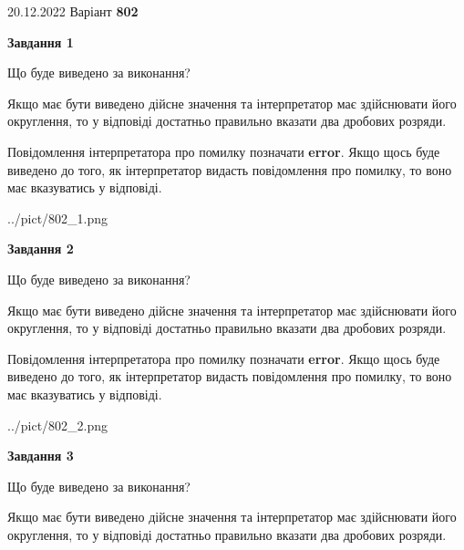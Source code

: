 \documentclass[12pt, ukrainian]{article}
\begin{document}
{20.12.2022 Варіант \No \textbf { 802 }\par}
{
\begin {Large}

{\begin {center}\textbf{Завдання 1}\end {center}}\par
Що буде виведено за виконання? \par

Якщо має бути виведено дійсне значення та інтерпретатор має здійснювати його округлення, 
то у відповіді достатньо правильно вказати два дробових розряди.

Повідомлення інтерпретатора про помилку позначати \textbf{error}.
Якщо щось буде виведено до того, як інтерпретатор видасть повідомлення про помилку, 
то воно має вказуватись у відповіді. \par

\begin{center}
	{../pict/802_1.png}
\end{center}
\newpage

{\begin {center}\textbf{Завдання 2}\end {center}}\par
Що буде виведено за виконання? \par

Якщо має бути виведено дійсне значення та інтерпретатор має здійснювати його округлення, 
то у відповіді достатньо правильно вказати два дробових розряди.

Повідомлення інтерпретатора про помилку позначати \textbf{error}.
Якщо щось буде виведено до того, як інтерпретатор видасть повідомлення про помилку, 
то воно має вказуватись у відповіді. \par

\begin{center}
	{../pict/802_2.png}
\end{center}
\newpage

{\begin {center}\textbf{Завдання 3}\end {center}}\par
Що буде виведено за виконання? \par

Якщо має бути виведено дійсне значення та інтерпретатор має здійснювати його округлення, 
то у відповіді достатньо правильно вказати два дробових розряди.


\end{Large}}
\end{document}
